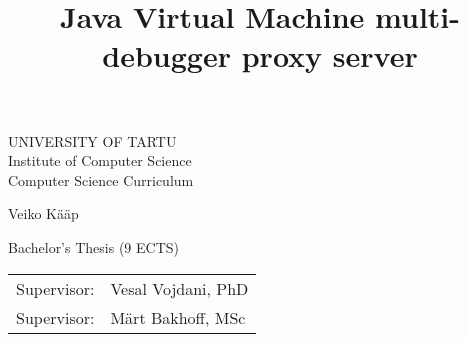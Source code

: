 \documentclass{style/bachelor-thesis}
\title{Java Virtual Machine multi-debugger proxy server}
\begin{document}
\thispagestyle{empty}
\begin{center}

\large
UNIVERSITY OF TARTU\\[2mm]
Institute of Computer Science\\
Computer Science Curriculum\\[2mm]

\vspace{25mm}

\Large Veiko Kääp

\vspace{4mm}

\huge \articleName

\vspace{20mm}

\Large Bachelor's Thesis (9 ECTS)

\end{center}

\vspace{2mm}

\begin{flushright}
 {
 \setlength{\extrarowheight}{5pt}
 \begin{tabular}{r l} 
  \sffamily Supervisor: & \sffamily Vesal Vojdani, PhD \\
  \sffamily Supervisor: & \sffamily Märt Bakhoff, MSc
 \end{tabular}
 }
\end{flushright}

\vspace{10mm}

\vspace{2mm}



\vspace{2mm}


\vspace{8mm}
\end{document}

